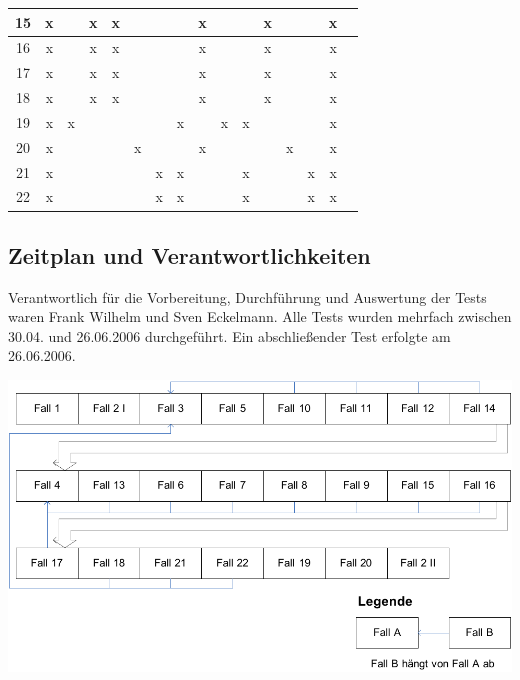 \begin{longtable}{|c|c|c|c|c|c|c|c|c|c|c|c|c|c|c|c|}
15 & x &   & x & x &   &   &   & x &   &   & x &   &   & x &  \\\hline
16 & x &   & x & x &   &   &   & x &   &   & x &   &   & x &  \\\hline
17 & x &   & x & x &   &   &   & x &   &   & x &   &   & x &  \\\hline
18 & x &   & x & x &   &   &   & x &   &   & x &   &   & x &  \\\hline
19 & x & x &   &   &   &   & x &   & x & x &   &   &   & x &  \\\hline
20 & x &   &   &   & x &   &   & x &   &   &   & x &   & x &  \\\hline
21 & x &   &   &   &   & x & x &   &   & x &   &   & x & x &  \\\hline
22 & x &   &   &   &   & x & x &   &   & x &   &   & x & x &  \\\hline
\end{longtable}

\subsection{Zeitplan und Verantwortlichkeiten}
Verantwortlich für die Vorbereitung, Durchführung und Auswertung der Tests waren Frank Wilhelm und Sven Eckelmann. Alle Tests wurden mehrfach zwischen 30.04. und 26.06.2006 durchgeführt. Ein abschließender Test erfolgte am 26.06.2006.

\includegraphics{testplan}

